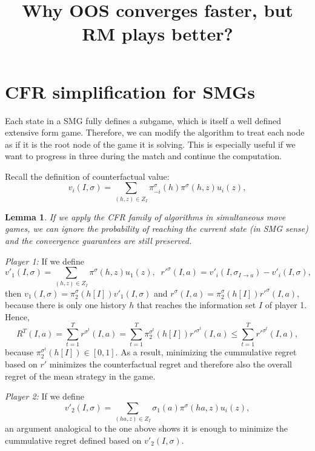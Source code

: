\documentclass[preprint,12pt]{elsarticle}
\newtheorem{lemma}[theorem]{Lemma}
\newenvironment{proof}[1][Proof]{\begin{trivlist}
\item[\hskip \labelsep {\bfseries #1}]}{\end{trivlist}}
\begin{document}
\begin{frontmatter}

\title{Why OOS converges faster, but RM plays better?}

\end{frontmatter}

\section{CFR simplification for SMGs}

Each state in a SMG fully defines a subgame, which is itself a well defined extensive form game. Therefore, we can modify the algorithm to treat each node as if it is the root node of the game it is solving. This is especially useful if we want to progress in three during the match and continue the computation.

Recall the definition of counterfactual value:
\begin{equation}
\label{eq:cfv}
v_i(I,\sigma) = \sum_{(h,z) \in Z_I} \pi^{\sigma}_{-i}(h) \pi^{\sigma}(h,z) u_i(z), 
\end{equation}


\begin{lemma}
If we apply the CFR family of algorithms in simultaneous move games, we can ignore the probability of reaching the current state (in SMG sense) and the convergence guarantees are still preserved.
\end{lemma}
\begin{proof}
\emph{Player 1:}
If we define 
\begin{equation}
v'_1(I,\sigma) = \sum_{(h,z) \in Z_I} \pi^{\sigma}(h,z) u_1(z),\;\; r'^{\sigma}(I,a)=v'_i(I,\sigma_{I\rightarrow a})-v'_i(I,\sigma),
\end{equation}
then $v_1(I,\sigma) = \pi^{\sigma}_{2}(h[I])v'_1(I,\sigma)$ and $r^\sigma(I,a)=\pi^{\sigma}_{2}(h[I])r'^\sigma(I,a)$, because there is only one history $h$ that reaches the information set $I$ of player 1. Hence,
\begin{equation}
R^T(I,a)=\sum_{t=1}^T r^{\sigma^t}(I,a) = \sum_{t=1}^T\pi^{\sigma^t}_{2}(h[I])r'^{\sigma^t}(I,a) \leq \sum_{t=1}^T r'^{\sigma^t}(I,a),
\end{equation}
because $\pi^{\sigma^t}_{2}(h[I]) \in [0,1]$. As a result, minimizing the cummulative regret based on $r'$ minimizes the counterfactual regret and therefore also the overall regret of the mean strategy in the game.

\noindent
\emph{Player 2:}
If we define 
\begin{equation}
v'_2(I,\sigma) = \sum_{(ha,z) \in Z_I} \sigma_1(a)\pi^{\sigma}(ha,z) u_i(z),
\end{equation}
an argument analogical to the one above shows it is enough to minimize the cummulative regret defined based on $v'_2(I,\sigma)$.
\end{proof}
\end{document}
